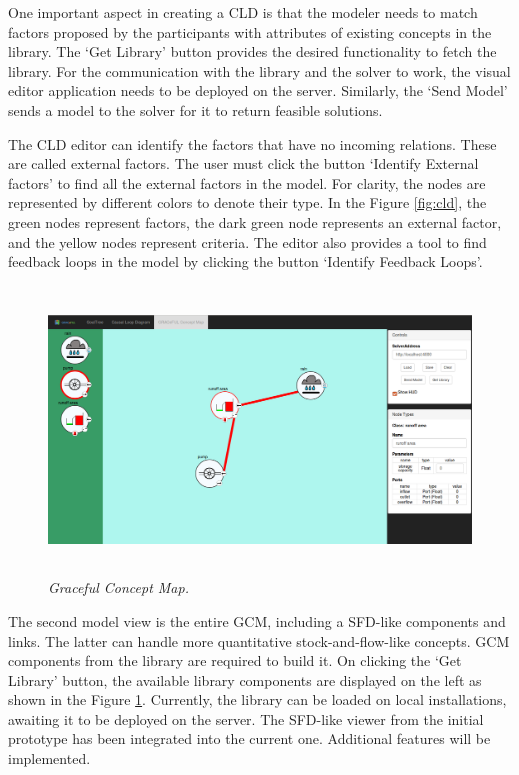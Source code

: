\documentclass[a4paper]{article}
\begin{document}
One important aspect in creating a CLD is that the modeler needs to match factors proposed by the participants with attributes of existing concepts in the library. The ‘Get Library’ button provides the desired functionality to fetch the library. For the communication with the library and the solver to work, the visual editor application needs to be deployed on the server. Similarly, the ‘Send Model’ sends a model to the solver for it to return feasible solutions.

The CLD editor can identify the factors that have no incoming relations. These are called external factors. The user must click the button ‘Identify External factors’ to find all the external factors in the model. For clarity, the nodes are represented by different colors to denote their type. In the Figure \ref{fig:cld}, the green nodes represent factors, the dark green node represents an external factor, and the yellow nodes represent criteria. The editor also provides a tool to find feedback loops in the model by clicking the button ‘Identify Feedback Loops’.

\begin{figure}
\begin{center}
\includegraphics[height=3in,width=5in]{img/sfd_like.png}
\caption{\small \sl Graceful Concept Map.\label{fig:sfd_like}}
\end{center}
\end{figure}

The second model view is the entire GCM, including a SFD-like components and links. The latter can handle more quantitative stock-and-flow-like concepts. GCM components from the library are required to build it. On clicking the ‘Get Library’ button, the available library components are displayed on the left as shown in the Figure \ref{fig:sfd_like}. Currently, the library can be loaded on local installations, awaiting it to be deployed on the server. The SFD-like viewer from the initial prototype has been integrated into the current one. Additional features will be implemented.
\end{document}
